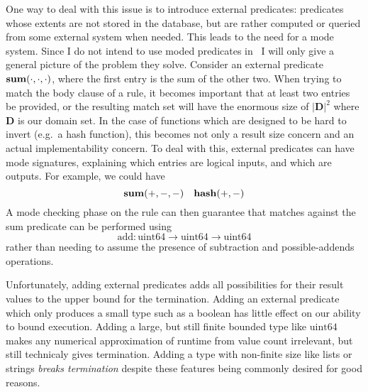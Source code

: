 One way to deal with this issue is to introduce external predicates: predicates whose extents are not stored in the database, but are rather computed or queried from some external system when needed.
This leads to the need for a mode system.
Since I do not intend to use moded predicates in \sysname\, I will only give a general picture of the problem they solve.
Consider an external predicate ${\bf sum}(\cdot, \cdot, \cdot)$, where the first entry is the sum of the other two.
When trying to match the body clause of a rule, it becomes important that at least two entries be provided, or the resulting match set will have the enormous size of $|\mathbf{D}|^2$ where $\mathbf{D}$ is our domain set.
In the case of functions which are designed to be hard to invert (e.g.\ a hash function), this becomes not only a result size concern and an actual implementability concern.
To deal with this, external predicates can have mode signatures, explaining which entries are logical inputs, and which are outputs. For example, we could have
\[
        {\bf sum}(+, -, -) \quad {\bf hash}(+, -)
\]
A mode checking phase on the rule can then guarantee that matches against the sum predicate can be performed using
\[
        \textrm{add} : \textrm{uint64} \rightarrow \textrm{uint64} \rightarrow \textrm{uint64}
\]
rather than needing to assume the presence of subtraction and possible-addends operations.

Unfortunately, adding external predicates adds all possibilities for their result values to the upper bound for the termination.
Adding an external predicate which only produces a small type such as a boolean has little effect on our ability to bound execution.
Adding a large, but still finite bounded type like $\textrm{uint64}$ makes any numerical approximation of runtime from value count irrelevant, but still technicaly gives termination.
Adding a type with non-finite size like lists or strings \emph{breaks termination} despite these features being commonly desired for good reasons.

